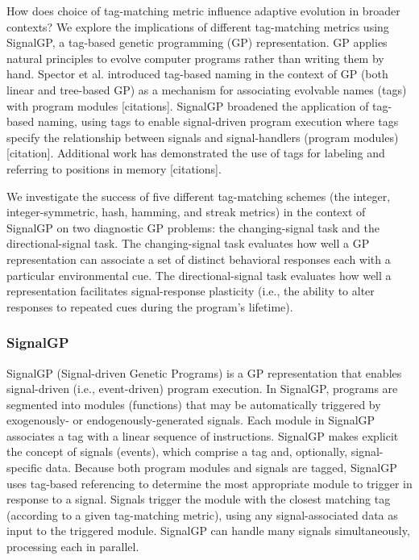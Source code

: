 
How does choice of tag-matching metric influence adaptive evolution in broader contexts?
We explore the implications of different tag-matching metrics using SignalGP, a tag-based genetic programming (GP) representation.
GP applies natural principles to evolve computer programs rather than writing them by hand.
Spector et al. introduced tag-based naming in the context of GP (both linear and tree-based GP) as a mechanism for associating evolvable names (tags) with program modules [citations].
SignalGP broadened the application of tag-based naming, using tags to enable signal-driven program execution where tags specify the relationship between signals and signal-handlers (program modules) [citation].
Additional work has demonstrated the use of tags for labeling and referring to positions in memory [citations].

We investigate the success of five different tag-matching schemes (the integer, integer-symmetric, hash, hamming, and streak metrics) in the context of SignalGP on two diagnostic GP problems: the changing-signal
task and the directional-signal task.
The changing-signal task evaluates how well a GP representation can associate a set of distinct behavioral responses each with a particular environmental cue.
The directional-signal task evaluates how well a representation facilitates signal-response plasticity (i.e., the ability to alter responses to repeated cues during the program's lifetime).

\subsubsection{SignalGP}

SignalGP (Signal-driven Genetic Programs) is a GP representation that enables signal-driven (i.e., event-driven) program execution.
In SignalGP, programs are segmented into modules (functions) that may be automatically triggered by exogenously- or endogenously-generated signals.
Each module in SignalGP associates a tag with a linear sequence of instructions.
SignalGP makes explicit the concept of signals (events), which comprise a tag and, optionally, signal-specific data.
Because both program modules and signals are tagged, SignalGP uses tag-based referencing to determine the most appropriate module to trigger in response to a signal.
Signals trigger the module with the closest matching tag (according to a given tag-matching metric), using any signal-associated data as input to the triggered module.
SignalGP can handle many signals simultaneously, processing each in parallel.

